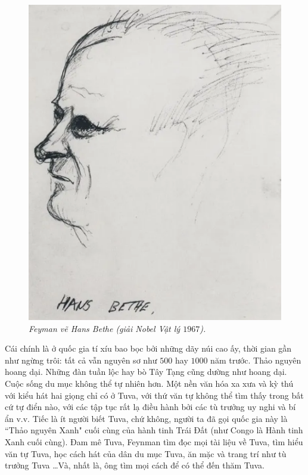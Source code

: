 \begin{multicols}{2}
\begin{figure}[H]
		\includegraphics[width= 1\linewidth]{3a}
		\caption{\small\textit{\color{quantoan}Feyman vẽ Hans Bethe (giải Nobel Vật lý $1967$).}}
		\vspace*{-10pt}
	\end{figure}
	Cái chính là ở quốc gia tí xíu bao bọc bởi những dãy núi cao ấy, thời gian gần như ngừng trôi: tất cả vẫn nguyên sơ như $500$ hay $1000$ năm trước. Thảo nguyên hoang dại. Những đàn tuần lộc hay bò Tây Tạng cũng dường như hoang dại. Cuộc sống du mục không thể tự nhiên hơn. Một nền văn hóa xa xưa và kỳ thú với kiểu hát hai giọng chỉ có ở Tuva, với thứ văn tự không thể tìm thấy trong bất cứ tự điển nào, với các tập tục rất lạ điều hành bởi các tù trưởng uy nghi và bí ẩn v.v. Tiếc là ít người biết Tuva, chứ không, người ta đã gọi quốc gia này là ``Thảo nguyên Xanh" cuối cùng của hành tinh Trái Đất (như Congo là Hành tinh Xanh cuối cùng). Đam mê Tuva, Feynman tìm đọc mọi tài liệu về Tuva, tìm hiểu văn tự Tuva, học cách hát của dân du mục Tuva, ăn mặc và trang trí như tù trưởng Tuva \ldots Và, nhất là, ông tìm mọi cách để có thể đến thăm Tuva.
	\vskip 0.1cm

\end{multicols}
